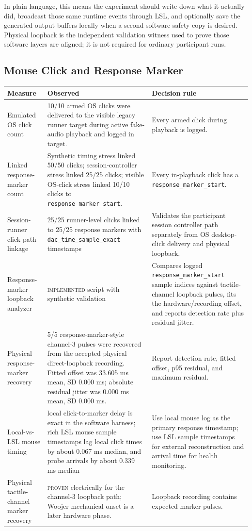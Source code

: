 \documentclass[11pt]{article}
\newcommand{\implemented}{\textsc{implemented}}
\newcommand{\proven}{\textsc{proven}}
\begin{document}
In plain language, this means the experiment should write down what it actually
did, broadcast those same runtime events through LSL, and optionally save the
generated output buffers locally when a second software safety copy is desired.
Physical loopback is the independent validation witness used to prove those
software layers are aligned; it is not required for ordinary participant runs.

\subsection{Mouse Click and Response Marker}

\begin{longtable}{|p{}|p{}|p{}|}
\hline
\textbf{Measure} & \textbf{Observed} & \textbf{Decision rule} \\
\hline
Emulated OS click count & 10/10 armed OS clicks were delivered to the visible
legacy runner target during active fake-audio playback and logged in target. &
Every armed click during playback is logged. \\
\hline
Linked response-marker count & Synthetic timing stress linked 50/50 clicks;
session-controller stress linked 25/25 clicks; visible OS-click stress linked
10/10 clicks to \texttt{response\_marker\_start}. & Every in-playback click has
a \texttt{response\_marker\_start}. \\
\hline
Session-runner click-path linkage & 25/25 runner-level clicks linked to 25/25
response markers with \texttt{dac\_time\_sample\_exact} timestamps & Validates
the participant session controller path separately from OS desktop-click
delivery and physical loopback. \\
\hline
Response-marker loopback analyzer & \implemented{} script with synthetic
validation & Compares logged \texttt{response\_marker\_start} sample indices
against tactile-channel loopback pulses, fits the hardware/recording offset,
and reports detection rate plus residual jitter. \\
\hline
Physical response-marker recovery & 5/5 response-marker-style channel-3 pulses
were recovered from the accepted physical direct-loopback recording. Fitted
offset was 33.605 ms mean, SD 0.000 ms; absolute residual jitter was
0.000 ms mean, SD 0.000 ms. & Report detection rate, fitted offset, p95
residual, and maximum residual. \\
\hline
Local-vs-LSL mouse timing & local click-to-marker delay is exact in the
software harness; rich LSL mouse sample timestamps lag local click times by
about 0.067 ms median, and probe arrivals by about 0.339 ms median & Use local
mouse log as the primary response timestamp; use LSL sample timestamps for
external reconstruction and arrival time for health monitoring. \\
\hline
Physical tactile-channel marker recovery & \proven{} electrically for the
channel-3 loopback path; Woojer mechanical onset is a later hardware phase. &
Loopback recording contains expected marker pulses. \\
\hline
\end{longtable}
\end{document}
